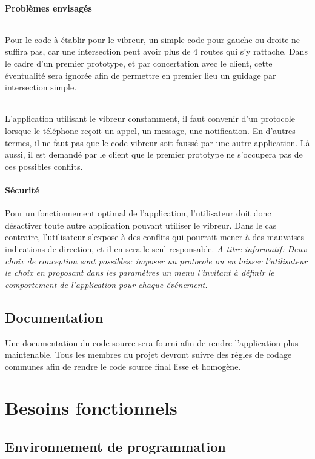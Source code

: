 \documentclass[12pt]{report}
\begin{document}
\subsubsection{Problèmes envisagés}
\subparagraph{} Pour le code à établir pour le vibreur, un simple code pour gauche ou droite ne suffira pas, car une intersection peut avoir plus de 4 routes qui s'y rattache. Dans le cadre d'un premier prototype, et par concertation avec le client, cette éventualité sera ignorée afin de permettre en premier lieu un guidage par intersection simple.
\subparagraph{} L'application utilisant le vibreur constamment, il faut convenir d'un protocole lorsque le téléphone reçoit un appel, un message, une notification. En d'autres termes, il ne faut pas que le code vibreur soit faussé par une autre application. Là aussi, il est demandé par le client que le premier prototype ne s'occupera pas de ces possibles conflits. 

\subsubsection{Sécurité}
Pour un fonctionnement optimal de l'application, l'utilisateur doit donc désactiver toute autre application pouvant utiliser le vibreur. Dans le cas contraire, l'utilisateur s'expose à des conflits qui pourrait mener à des mauvaises indications de direction, et il en sera le seul responsable. \emph{ A titre informatif: Deux choix de conception sont possibles: imposer un protocole ou en laisser l'utilisateur le choix en proposant dans les paramètres un menu l'invitant à définir le comportement de l'application pour chaque événement.}

\section{Documentation}
Une documentation du code source sera fourni afin de rendre l'application plus maintenable. Tous les membres du projet devront suivre des règles de codage communes afin de rendre le code source final lisse et homogène.

\newpage
\chapter*{Besoins fonctionnels}
\setcounter{chapter}{2}
\setcounter{section}{0}
\label{ch:BF}

\section{Environnement de programmation}
\end{document}
